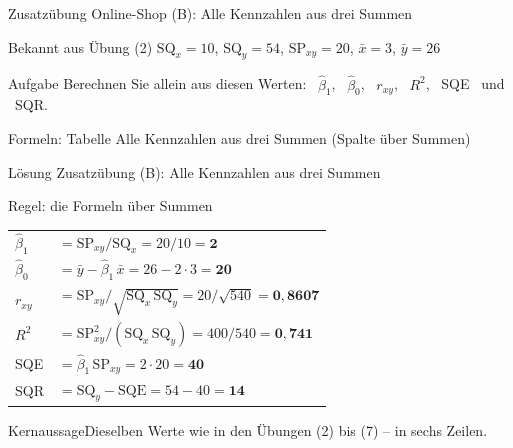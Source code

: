 \documentclass[aspectratio=169,11pt]{beamer}
\newcommand{\kernaussage}[1]{\begin{alertblock}{Kernaussage}#1\end{alertblock}}
\newcommand{\SQx}{\text{SQ}_x}
\newcommand{\SQy}{\text{SQ}_y}
\newcommand{\SPxy}{\text{SP}_{xy}}
\begin{document}
\begin{frame}{Zusatzübung Online-Shop (B): Alle Kennzahlen aus drei Summen}
  \begin{block}{Bekannt aus Übung (2)}
    $\SQx = 10$, \quad $\SQy = 54$, \quad $\SPxy = 20$, \quad $\bar{x} = 3$, \quad $\bar{y} = 26$
  \end{block}

  \medskip

  \begin{exampleblock}{Aufgabe}
    Berechnen Sie allein aus diesen Werten: \ $\hat{\beta}_1$, \ $\hat{\beta}_0$, \
    $r_{xy}$, \ $R^{2}$, \ SQE \ und \ SQR.
  \end{exampleblock}

  \medskip

  \begin{center}
    \small Formeln: Tabelle \glqq Alle Kennzahlen aus drei Summen\grqq{} (Spalte \glqq über Summen\grqq)
  \end{center}
\end{frame}

\begin{frame}{Lösung Zusatzübung (B): Alle Kennzahlen aus drei Summen}
  \begin{exampleblock}{Regel: die Formeln \glqq über Summen\grqq}
    \renewcommand{\arraystretch}{1.45}
    \begin{tabular}{@{}l@{\;}l@{}}
      $\hat{\beta}_1$ & $= \SPxy / \SQx = 20 / 10 = \mathbf{2}$ \\
      $\hat{\beta}_0$ & $= \bar{y} - \hat{\beta}_1\,\bar{x} = 26 - 2 \cdot 3 = \mathbf{20}$ \\
      $r_{xy}$        & $= \SPxy / \sqrt{\SQx\,\SQy} = 20 / \sqrt{540} = \mathbf{0{,}8607}$ \\
      $R^{2}$         & $= \SPxy^{2} / (\SQx\,\SQy) = 400 / 540 = \mathbf{0{,}741}$ \\
      SQE             & $= \hat{\beta}_1\,\SPxy = 2 \cdot 20 = \mathbf{40}$ \\
      SQR             & $= \SQy - \text{SQE} = 54 - 40 = \mathbf{14}$
    \end{tabular}
  \end{exampleblock}

  \medskip

  \kernaussage{Dieselben Werte wie in den Übungen (2) bis (7) -- in sechs Zeilen.}
\end{frame}
\end{document}
